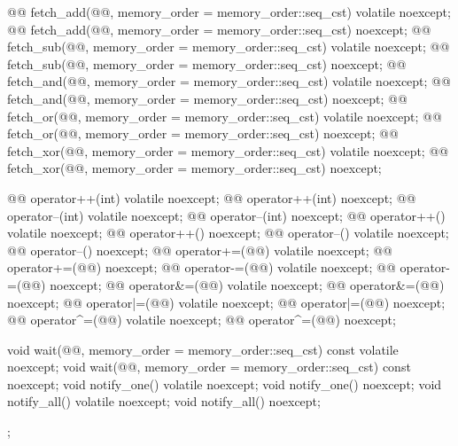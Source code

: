 \begin{codeblock}
{{    @@ fetch_add(@@, memory_order = memory_order::seq_cst) volatile noexcept;
    @@ fetch_add(@@, memory_order = memory_order::seq_cst) noexcept;
    @@ fetch_sub(@@, memory_order = memory_order::seq_cst) volatile noexcept;
    @@ fetch_sub(@@, memory_order = memory_order::seq_cst) noexcept;
    @@ fetch_and(@@, memory_order = memory_order::seq_cst) volatile noexcept;
    @@ fetch_and(@@, memory_order = memory_order::seq_cst) noexcept;
    @@ fetch_or(@@, memory_order = memory_order::seq_cst) volatile noexcept;
    @@ fetch_or(@@, memory_order = memory_order::seq_cst) noexcept;
    @@ fetch_xor(@@, memory_order = memory_order::seq_cst) volatile noexcept;
    @@ fetch_xor(@@, memory_order = memory_order::seq_cst) noexcept;

    @@ operator++(int) volatile noexcept;
    @@ operator++(int) noexcept;
    @@ operator--(int) volatile noexcept;
    @@ operator--(int) noexcept;
    @@ operator++() volatile noexcept;
    @@ operator++() noexcept;
    @@ operator--() volatile noexcept;
    @@ operator--() noexcept;
    @@ operator+=(@@) volatile noexcept;
    @@ operator+=(@@) noexcept;
    @@ operator-=(@@) volatile noexcept;
    @@ operator-=(@@) noexcept;
    @@ operator&=(@@) volatile noexcept;
    @@ operator&=(@@) noexcept;
    @@ operator|=(@@) volatile noexcept;
    @@ operator|=(@@) noexcept;
    @@ operator^=(@@) volatile noexcept;
    @@ operator^=(@@) noexcept;

    void wait(@@, memory_order = memory_order::seq_cst) const volatile noexcept;
    void wait(@@, memory_order = memory_order::seq_cst) const noexcept;
    void notify_one() volatile noexcept;
    void notify_one() noexcept;
    void notify_all() volatile noexcept;
    void notify_all() noexcept;
  };
}
\end{codeblock}

